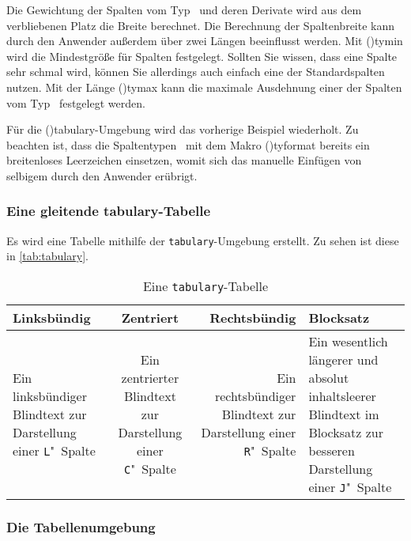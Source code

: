 \documentclass[%
  english,ngerman,%
  cdgeometry=no,DIV=12,%
  cd=false,cdfont=false,cdtitle=true,%
  headings=normal,%
  automark,%
  listof=toc,%
]{tudscrartcl}
\begin{document}
Die Gewichtung der Spalten vom Typ~ und deren Derivate wird aus 
dem verbliebenen Platz die Breite berechnet. Die Berechnung der Spaltenbreite 
kann durch den Anwender außerdem über zwei Längen beeinflusst werden. Mit 
\Length(){tymin} wird die Mindestgröße für Spalten 
festgelegt. Sollten Sie wissen, dass eine Spalte sehr schmal wird, können Sie 
allerdings auch einfach eine der Standardspalten~ nutzen. Mit der 
Länge \Length(){tymax} kann die maximale Ausdehnung einer der 
Spalten vom Typ~ festgelegt werden. 

Für die \Environment(){tabulary}-Umgebung wird das vorherige 
Beispiel wiederholt. Zu beachten ist, dass die Spaltentypen~ mit 
dem Makro \Macro(){tyformat} bereits ein breitenloses 
Leerzeichen einsetzen, womit sich das manuelle Einfügen von selbigem durch den 
Anwender erübrigt.
%
\begin{Trunk+}
\subsubsection{Eine gleitende tabulary-Tabelle}

Es wird eine Tabelle mithilfe der \texttt{tabulary}-Umgebung erstellt. 
Zu sehen ist diese in \autoref{tab:tabulary}. 

\end{Trunk+}
\begin{Trunk}
\begin{table}
\begin{tabulary}{\textwidth}{@{}LCRJ@{}}
\toprule
\textbf{Linksbündig} & \textbf{Zentriert} & 
\textbf{Rechtsbündig} & \textbf{Blocksatz} \tabularnewline\midrule
Ein linksbündiger Blindtext 
  zur Darstellung einer \texttt{L}"~Spalte &
Ein zentrierter Blindtext 
  zur Darstellung einer \texttt{C}"~Spalte &
Ein rechtsbündiger Blindtext 
  zur Darstellung einer \texttt{R}"~Spalte &
Ein wesentlich längerer und absolut inhaltsleerer Blindtext im Blocksatz 
  zur besseren Darstellung einer \texttt{J}"~Spalte
\tabularnewline\bottomrule
\end{tabulary}
\caption{Eine \texttt{tabulary}-Tabelle\label{tab:tabulary}}
\end{table}

\end{Trunk}
\InputCode



\subsubsection{%
  Die Tabellenumgebung %
  \label{sec:tabu}%
}
\end{document}

